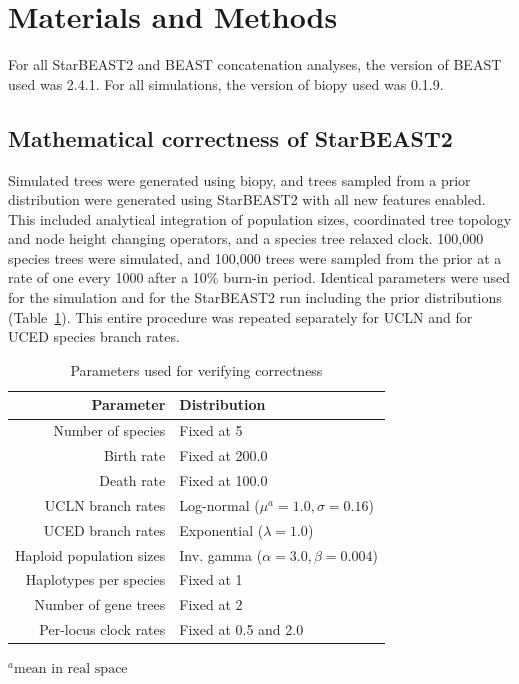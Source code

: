\documentclass[12pt]{article}
\begin{document}
\section{Materials and Methods}

For all StarBEAST2 and BEAST concatenation analyses, the version of BEAST used was
2.4.1. For all simulations, the version of biopy \citep{biopy} used was 0.1.9.

\subsection{Mathematical correctness of StarBEAST2}

Simulated trees were generated using biopy, and trees sampled from a prior
distribution were generated using StarBEAST2 with all new features enabled. This
included analytical integration of population sizes, coordinated tree topology
and node height changing operators, and a species tree relaxed clock. 100,000
species trees were simulated, and 100,000 trees were sampled from the prior at a
rate of one every 1000 after a 10\% burn-in period. Identical parameters were
used for the simulation and for the StarBEAST2 run including the prior
distributions (Table~\ref{tab:correctParameters}). This entire procedure was
repeated separately for UCLN and for UCED species branch rates.

\begin{table}[htb!]
\centering
\caption{Parameters used for verifying correctness}
\label{tab:correctParameters}
\begin{threeparttable}
\begin{adjustbox}{center}
\small
\begin{tabular}{rl}
\hline
Parameter & Distribution\tabularnewline
\hline
Number of species & Fixed at 5\tabularnewline
Birth rate & Fixed at 200.0\tabularnewline
Death rate & Fixed at 100.0\tabularnewline
UCLN branch rates & Log-normal ($\mu^a = 1.0, \sigma = 0.16$)\tabularnewline
UCED branch rates & Exponential ($\lambda = 1.0$)\tabularnewline
Haploid population sizes & Inv. gamma ($\alpha = 3.0, \beta = 0.004$)\tabularnewline
Haplotypes per species & Fixed at 1\tabularnewline
Number of gene trees & Fixed at 2\tabularnewline
Per-locus clock rates & Fixed at 0.5 and 2.0\tabularnewline
\hline
\end{tabular}
\end{adjustbox}
\begin{tablenotes}
\item ${}^a\text{mean in real space}$
\end{tablenotes}
\end{threeparttable}
\end{table}
\end{document}
